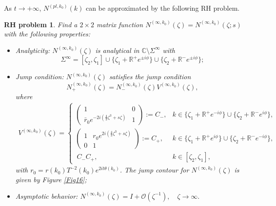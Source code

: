 \documentclass[11pt]{article}
\numberwithin{equation}{section}
\newtheorem{RHP}{RH problem}
\begin{document}
As $t\to +\infty$, $N^{(pl,k_0)}(k)$  can be approximated by the following  RH problem.



\begin{RHP}\label{rhp22}
    Find   a $2\times2$ matrix function $N^{(\infty,k_0)}( \zeta)=N^{(\infty,k_0)}(\zeta;s )$   with the following properties:
	\begin{itemize}
		\item Analyticity: $N^{(\infty,k_0)}(\zeta)$ is analytical in $ \mathbb{C} \setminus \Sigma^{\infty}$ with
        $$\Sigma^{\infty}=[\zeta_2,\zeta_1]\cup\{\zeta_1+\mathbb{R}^+e^{\pm i\phi}\}\cup\{\zeta_2+\mathbb{R}^-e^{\pm i\phi}\};$$
		\item Jump condition: $N^{(\infty,k_0)}(\zeta)$  satisfies the jump condition\begin{equation*}
			N^{(\infty,k_0)}_+( \zeta)=N^{(\infty,k_0)}_-(\zeta)V^{(\infty,k_0)}(\zeta),
		\end{equation*}
		where
		\begin{align}
			V^{(\infty,k_0)}(\zeta)= \begin{cases}
				 \left( \begin{array}{cc}
					1& 0\\
					\bar r_0   e^{ -2i \left(\frac{4}{3}  \zeta^3 +  s\zeta \right) }   & 1
				\end{array}\right):=C_-,  &k\in \{\zeta_1+\mathbb{R}^+e^{- i\phi}\}\cup\{\zeta_2+\mathbb{R}^-e^{ i\phi}\},\\
				 \left(	\begin{array}{cc}
					1&   r_0 e^{ 2i \left(\frac{4}{3}  \zeta^3 +  s\zeta \right) }  \\
					0 & 1
				\end{array}\right) :=C_+, & k \in  \{\zeta_1+\mathbb{R}^+e^{ i\phi}\}\cup\{\zeta_2+\mathbb{R}^-e^{- i\phi}\},\\
			\ C_- C_+,\quad & k \in [\zeta_2,\zeta_1],
			\end{cases}
		\end{align}
     with  $r_0=r(k_0)T^{-2}(k_0)e^{2it\theta(k_0)}$. The jump contour for $N^{(\infty,k_0)}(\zeta)$  is given by  Figure \ref{Fig16};
		\item  Asymptotic behavior: $N^{(\infty,k_0)}( \zeta)=I+\mathcal{O}(\zeta ^{-1}),	\quad \zeta \to  \infty.$	
	\end{itemize}
\end{RHP}
\end{document}
